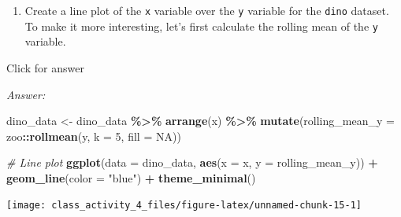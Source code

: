 \documentclass[
]{book}
\newenvironment{Shaded}{\begin{snugshade}}{\end{snugshade}}
\newcommand{\AttributeTok}[1]{\textcolor[rgb]{0.13,0.29,0.53}{#1}}
\newcommand{\CommentTok}[1]{\textcolor[rgb]{0.56,0.35,0.01}{\textit{#1}}}
\newcommand{\ConstantTok}[1]{\textcolor[rgb]{0.56,0.35,0.01}{#1}}
\newcommand{\DecValTok}[1]{\textcolor[rgb]{0.00,0.00,0.81}{#1}}
\newcommand{\FunctionTok}[1]{\textcolor[rgb]{0.13,0.29,0.53}{\textbf{#1}}}
\newcommand{\NormalTok}[1]{#1}
\newcommand{\OtherTok}[1]{\textcolor[rgb]{0.56,0.35,0.01}{#1}}
\newcommand{\SpecialCharTok}[1]{\textcolor[rgb]{0.81,0.36,0.00}{\textbf{#1}}}
\newcommand{\StringTok}[1]{\textcolor[rgb]{0.31,0.60,0.02}{#1}}
\providecommand{\tightlist}{%
  \setlength{\itemsep}{0pt}\setlength{\parskip}{0pt}}
\begin{document}
\begin{enumerate}
\def\labelenumi{\alph{enumi}.}
\tightlist
\item
  Create a line plot of the \texttt{x} variable over the \texttt{y} variable for the \texttt{dino} dataset. To make it more interesting, let's first calculate the rolling mean of the \texttt{y} variable.
\end{enumerate}

Click for answer

\emph{Answer:}

\begin{Shaded}
\begin{Highlighting}[]
\NormalTok{dino\_data }\OtherTok{\textless{}{-}}\NormalTok{ dino\_data }\SpecialCharTok{\%\textgreater{}\%}
  \FunctionTok{arrange}\NormalTok{(x) }\SpecialCharTok{\%\textgreater{}\%}
  \FunctionTok{mutate}\NormalTok{(}\AttributeTok{rolling\_mean\_y =}\NormalTok{ zoo}\SpecialCharTok{::}\FunctionTok{rollmean}\NormalTok{(y, }\AttributeTok{k =} \DecValTok{5}\NormalTok{, }\AttributeTok{fill =} \ConstantTok{NA}\NormalTok{))}

\CommentTok{\# Line plot}
\FunctionTok{ggplot}\NormalTok{(}\AttributeTok{data =}\NormalTok{ dino\_data, }\FunctionTok{aes}\NormalTok{(}\AttributeTok{x =}\NormalTok{ x, }\AttributeTok{y =}\NormalTok{ rolling\_mean\_y)) }\SpecialCharTok{+}
  \FunctionTok{geom\_line}\NormalTok{(}\AttributeTok{color =} \StringTok{"blue"}\NormalTok{) }\SpecialCharTok{+}
  \FunctionTok{theme\_minimal}\NormalTok{()}
\end{Highlighting}
\end{Shaded}

\texttt{[image: class\_activity\_4\_files/figure-latex/unnamed-chunk-15-1]}

  
\end{document}
